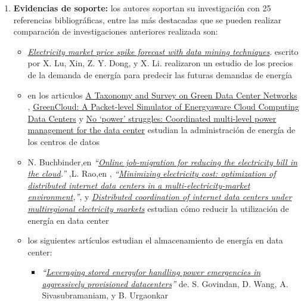 \documentclass[12pt]{article}
\begin{document}
\begin{enumerate}
	\item  \textbf{Evidencias de soporte:} los autores soportan su investigación con 25 referencias bibliográficas, entre las más destacadas que se pueden realizar comparación de investigaciones anteriores realizada son:
	\begin{itemize}
		\item 
	\href{http://www.sciencedirect.com/science/article/pii/S0378779604001257}{\textit{Electricity market price spike forecast with data mining techniques}}. escrito por X. Lu, Xin, Z. Y. Dong, y X. Li. realizaron un estudio de   los precios de la demanda de energía para predecir las futuras demandas de energía 
		
		\item en los articulos 	\href{http://sameekhan.seecs.nust.edu.pk/pub/B_K_2013_FGCS.pdf}{A Taxonomy and Survey on Green Data Center Networks}
		,	\href{http://ieeexplore.ieee.org/xpl/login.jsp?tp=&arnumber=5683561&url=http\%3A\%2F\%2Fieeexplore.ieee.org\%2Fiel5\%2F5682081\%2F5683069\%2F05683561.pdf\%3Farnumber\%3D5683561}{GreenCloud: A Packet-level Simulator of Energyaware Cloud Computing Data Centers} y \href{http://www.hpl.hp.com/techreports/2007/HPL-2007-194.pdf}{No ‘power’ struggles: Coordinated multi-level power management for the data center} estudian la administración de energía de los centros de datos
		
		
		
		\item	N. Buchbinder,en  \textit{“\href{http://research.microsoft.com/en-us/um/people/navendu/papers/buchbinder11online.pdf}{Online job-migration for reducing the electricity bill in the cloud}.”} ,L. Rao,en , \textit{“\href{http://ieeexplore.ieee.org/xpls/abs_all.jsp?arnumber=5461933&tag=1}{Minimizing electricity cost: optimization of distributed internet data centers in a multi-electricity-market environment},”}, y \textit{\href{http://ieeexplore.ieee.org/xpls/abs_all.jsp?arnumber=5989839}{Distributed coordination of internet data centers under multiregional electricity markets}}  estudian cómo reducir la utilización de energía en data center
		\item los siguientes artículos estudian el almacenamiento de energía en data center:
			\begin{itemize}					
				\item \textit{“\href{http://www.cse.psu.edu/~buu1/papers/ps/asplos12.pdf}{Leveraging stored energyfor handling power emergencies in aggressively provisioned datacenters}”} de. S. Govindan, D. Wang, A. Sivasubramaniam, y B. Urgaonkar
				

\end{itemize}
\end{itemize}
\end{enumerate}
\end{document}
